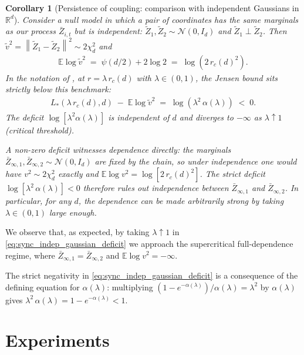 \documentclass{article}
\newcommand{\RR}{\mathbb{R}}
\newcommand{\Brack}[1]{\left( #1 \right)}
\newcommand{\Exp}[1]{\mathbb{E} #1}
\newcommand{\norm}[1]{\left\|#1\right\|}
\newtheorem{corollary}[theorem]{Corollary}
\newcommand{\mcN}{\mathcal{N}}
\newcommand{\bZ}{\bar{Z}}
\begin{document}
\begin{corollary}[Persistence of coupling: comparison with independent Gaussians in $\RR^d$]
  \label{rem:sync_indep_gaussian_comparison}
  Consider a null model in which a pair of coordinates has the same marginals as our process $\bZ_{i,t}$ but is independent: $\tilde Z_1, \tilde Z_2 \sim \mcN(0, I_d)$ and $\tilde Z_1 \perp \tilde Z_2$. Then $\tilde v^2 = \norm{\tilde Z_1 - \tilde Z_2}^2 \sim 2\chi^2_d$ and
  \begin{eqnarray}
    \label{eq:sync_indep_gaussian_logv}
    \Exp{\log \tilde v^2} \;=\; \psi(d/2) + 2\log 2 \;=\; \log\Brack{2\,r_c(d)^2}.
  \end{eqnarray}
  In the notation of , at $r = \lambda\,r_c(d)$ with $\lambda \in (0, 1)$, the Jensen bound sits \emph{strictly below} this benchmark:
  \begin{eqnarray}
    \label{eq:sync_indep_gaussian_deficit}
    L_*(\lambda\,r_c(d), d) \;-\; \Exp{\log \tilde v^2} \;=\; \log\Brack{\lambda^2\,\alpha(\lambda)} \;<\; 0.
  \end{eqnarray}
  The deficit $\log[\lambda^2 \alpha(\lambda)]$ is \emph{independent of $d$} and  diverges to $-\infty$ as $\lambda \uparrow 1$ (critical threshold).

  A non-zero deficit witnesses dependence directly: the marginals $\bZ_{\infty,1}, \bZ_{\infty,2} \sim \mcN(0, I_d)$ are fixed by the chain, so under independence one would have $v^2 \sim 2\chi^2_d$ exactly and $\Exp{\log v^2} = \log[2\,r_c(d)^2]$. The strict deficit $\log[\lambda^2\,\alpha(\lambda)] < 0$ therefore rules out independence between $\bZ_{\infty,1}$ and $\bZ_{\infty,2}$. In particular, for any $d$, the dependence can be made arbitrarily strong by taking $\lambda \in (0, 1)$ large enough.
\end{corollary}

We observe that, as expected, by taking $\lambda \uparrow 1$ in \eqref{eq:sync_indep_gaussian_deficit} we approach the supercritical full-dependence regime, where $\bZ_{\infty,1} = \bZ_{\infty,2}$ and $\Exp{\log v^2} = -\infty$.

The strict negativity in \eqref{eq:sync_indep_gaussian_deficit} is a consequence of the defining equation for $\alpha(\lambda)$: multiplying $(1 - e^{-\alpha(\lambda)})/\alpha(\lambda) = \lambda^2$ by $\alpha(\lambda)$ gives $\lambda^2\, \alpha(\lambda) = 1 - e^{-\alpha(\lambda)} < 1$.

\section{Experiments}
\label{sec:experiments}
\end{document}
